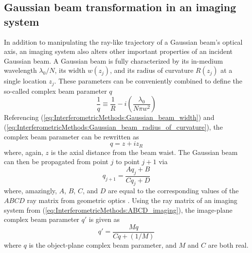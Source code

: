 \subsection{Gaussian beam transformation in an imaging system}
In addition to manipulating the ray-like trajectory
of a Gaussian beam's optical axis,
an imaging system also alters
other important properties of an incident Gaussian beam.
A Gaussian beam is fully characterized by
its in-medium wavelength $\lambda_0 / N$,
its width $w(z_j)$, and
its radius of curvature $R(z_j)$
at a single location $z_j$.
These parameters can be conveniently combined
to define the so-called complex beam parameter $q$
\cite[Sec.~17.1]{siegman_lasers}
\begin{equation}
  \frac{1}{q}
  \equiv
  \frac{1}{R}
  -
  i \left( \frac{\lambda_0}{N \pi w^2} \right)
  \label{eq:InterferometricMethods:complex_beam_parameter_inverse}
\end{equation}
Referencing (\ref{eq:InterferometricMethods:Gaussian_beam_width}) and
(\ref{eq:InterferometricMethods:Gaussian_beam_radius_of_curvature}),
the complex beam parameter can be rewritten as
\begin{equation}
  q = z + i z_R
  \label{eq:InterferometricMethods:complex_beam_parameter}
\end{equation}
where, again, $z$ is the axial distance from the beam waist.
The Gaussian beam can then be propagated from point $j$ to point $j + 1$ via
\begin{equation}
  q_{j+1}
  =
  \frac{A q_j + B}{C q_j + D}
  \label{eq:InterferometricMethods:complex_beam_parameter_propagation}
\end{equation}
where, amazingly, $A$, $B$, $C$, and $D$
are equal to the corresponding values
of the $ABCD$ ray matrix from geometric optics
\cite[Sec.~20.2]{siegman_lasers}.
Using the ray matrix of an imaging system from
(\ref{eq:InterferometricMethods:ABCD_imaging}),
the image-plane complex beam parameter $q'$ is given as
\begin{equation}
  q'
  =
  \frac{M q}{C q + (1 / M)}
  \label{eq:InterferometricMethods:complex_beam_parameter_image_plane}
\end{equation}
where $q$ is the object-plane complex beam parameter,
and $M$ and $C$ are both real.

